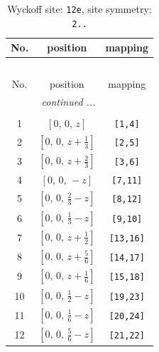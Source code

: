 \documentclass[fleqn,8pt]{jsarticle}
\begin{document}
\begin{longtable}{ccc}
\caption{Wyckoff site: {\tt 12e}, site symmetry: {\tt 2..}}
 \\
 \hline \hline
No. & position & mapping \\ \hline \endfirsthead

\multicolumn{2}{l}{\tablename\ \thetable{}} \\
 \hline \hline
No. & position & mapping \\ \hline \endhead

 \hline \hline
\multicolumn{2}{r}{\footnotesize\it continued ...} \\ \endfoot

 \hline \hline
\multicolumn{2}{r}{} \\ \endlastfoot

1 & $\left[ 0,\, 0,\, z \right]$ & {\tt [1,4]} \\ \hline
2 & $\left[ 0,\, 0,\, z + \frac{1}{3} \right]$ & {\tt [2,5]} \\ \hline
3 & $\left[ 0,\, 0,\, z + \frac{2}{3} \right]$ & {\tt [3,6]} \\ \hline
4 & $\left[ 0,\, 0,\, - z \right]$ & {\tt [7,11]} \\ \hline
5 & $\left[ 0,\, 0,\, \frac{2}{3} - z \right]$ & {\tt [8,12]} \\ \hline
6 & $\left[ 0,\, 0,\, \frac{1}{3} - z \right]$ & {\tt [9,10]} \\ \hline
7 & $\left[ 0,\, 0,\, z + \frac{1}{2} \right]$ & {\tt [13,16]} \\ \hline
8 & $\left[ 0,\, 0,\, z + \frac{5}{6} \right]$ & {\tt [14,17]} \\ \hline
9 & $\left[ 0,\, 0,\, z + \frac{1}{6} \right]$ & {\tt [15,18]} \\ \hline
10 & $\left[ 0,\, 0,\, \frac{1}{2} - z \right]$ & {\tt [19,23]} \\ \hline
11 & $\left[ 0,\, 0,\, \frac{1}{6} - z \right]$ & {\tt [20,24]} \\ \hline
12 & $\left[ 0,\, 0,\, \frac{5}{6} - z \right]$ & {\tt [21,22]} \\
\end{longtable}
\renewcommand{\arraystretch}{1.2}
\end{document}
